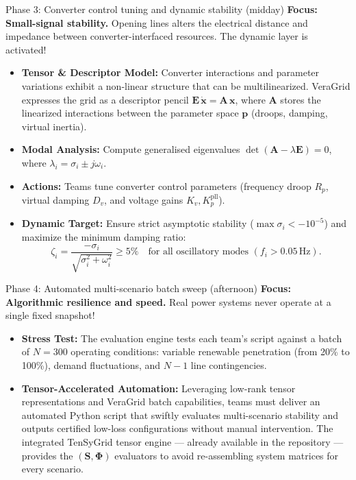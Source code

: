 \documentclass[11pt,a4paper]{article}
\begin{document}
\begin{challengebox}{Phase 3: Converter control tuning and dynamic stability (midday)}
  \textbf{Focus: Small-signal stability.} Opening lines alters the electrical distance and impedance between converter-interfaced resources. The dynamic layer is activated!
  \begin{itemize}[leftmargin=*, itemsep=1pt]
    \item \textbf{Tensor \& Descriptor Model:} Converter interactions and parameter variations exhibit a non-linear structure that can be multilinearized. VeraGrid expresses the grid as a descriptor pencil $\mathbf{E}\,\dot{\mathbf{x}} = \mathbf{A}\,\mathbf{x}$, where $\mathbf{A}$ stores the linearized interactions between the parameter space $\mathbf{p}$ (droops, damping, virtual inertia).
    \item \textbf{Modal Analysis:} Compute generalised eigenvalues $\det(\mathbf{A} - \lambda \mathbf{E}) = 0$, where $\lambda_i = \sigma_i \pm j\omega_i$.
    \item \textbf{Actions:} Teams tune converter control parameters (frequency droop $R_p$, virtual damping $D_v$, and voltage gains $K_v, K_p^{\text{pll}}$).
    \item \textbf{Dynamic Target:} Ensure strict asymptotic stability ($\max \sigma_i < -10^{-5}$) and maximize the minimum damping ratio:
          \begin{equation*}
            \zeta_i = \frac{-\sigma_i}{\sqrt{\sigma_i^2 + \omega_i^2}} \ge 5\% \quad \text{for all oscillatory modes } (f_i > 0.05\,\text{Hz}).
          \end{equation*}
  \end{itemize}
\end{challengebox}

\begin{challengebox}{Phase 4: Automated multi-scenario batch sweep (afternoon)}
  \textbf{Focus: Algorithmic resilience and speed.} Real power systems never operate at a single fixed snapshot!
  \begin{itemize}[leftmargin=*, itemsep=1pt]
    \item \textbf{Stress Test:} The evaluation engine tests each team's script against a batch of $N = 300$ operating conditions: variable renewable penetration (from 20\% to 100\%), demand fluctuations, and $N-1$ line contingencies.
    \item \textbf{Tensor-Accelerated Automation:} Leveraging low-rank tensor representations and VeraGrid batch capabilities, teams must deliver an automated Python script that swiftly evaluates multi-scenario stability and outputs certified low-loss configurations without manual intervention. The integrated TenSyGrid tensor engine --- already available in the repository --- provides the $( \mathbf{S}, \boldsymbol{\Phi})$ evaluators to avoid re-assembling system matrices for every scenario.
  \end{itemize}
\end{challengebox}
\end{document}
